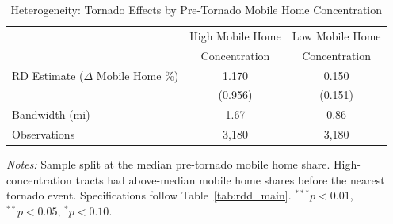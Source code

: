 \begin{table}[t]
\centering
\caption{Heterogeneity: Tornado Effects by Pre-Tornado Mobile Home Concentration}
\label{tab:heterogeneity}
\begin{tabular}{lcc}
\hline\hline
 & High Mobile Home & Low Mobile Home \\
 & Concentration & Concentration \\
\hline
RD Estimate ($\Delta$ Mobile Home \%) & 1.170 & 0.150 \\
 & (0.956) & (0.151) \\
Bandwidth (mi) & 1.67 & 0.86 \\
Observations & 3,180 & 3,180 \\
\hline\hline
\end{tabular}
\vspace{0.3em}
\raggedright\footnotesize
\textit{Notes:} Sample split at the median pre-tornado mobile home share. High-concentration tracts had above-median mobile home shares before the nearest tornado event. Specifications follow Table~\ref{tab:rdd_main}. $^{***}p<0.01$, $^{**}p<0.05$, $^{*}p<0.10$.
\end{table}

